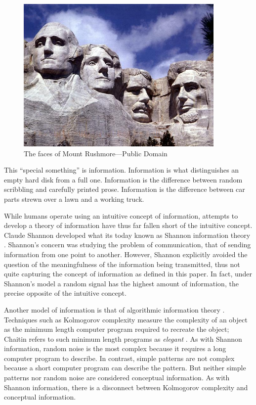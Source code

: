 \begin{figure}
\centering
\includegraphics[width=4in]{MountRushmore.jpg}
\caption{The faces of Mount Rushmore---Public Domain}
\end{figure}

This ``special something'' is information.
Information is what distinguishes an empty hard disk from a full one.
Information is the difference between random scribbling and carefully printed prose.
Information is the difference between car parts strewn over a lawn and a working truck.

While humans operate using an intuitive concept of information, attempts to develop a theory of information have thus far fallen short of the intuitive concept.
Claude Shannon developed what its today known as Shannon information theory \citep{Shannon1948}.
Shannon's concern was studying the problem of communication, that of sending information from one point to another.
However, Shannon explicitly avoided the question of the meaningfulness of the information being transmitted, thus not quite capturing the concept of information as defined in this paper.
In fact, under Shannon's model a random signal has the highest amount of information, the precise opposite of the intuitive concept.

Another model of information is that of algorithmic information theory \citep{Chaitin1966, Solomonoff1960, Kolmogorov1968a}.
Techniques such as Kolmogorov complexity measure the complexity of an object as the minimum length computer program required to recreate the object; Chaitin refers to such minimum length programs as \textit{elegant} \citep{Chaitin2002}.
As with Shannon information, random noise is the most complex because it requires a long computer program to describe.
In contrast, simple patterns are not complex because a short computer program can describe the pattern.
But neither simple patterns nor random noise are considered conceptual information.
As with Shannon information, there is a disconnect between Kolmogorov complexity and conceptual information.

